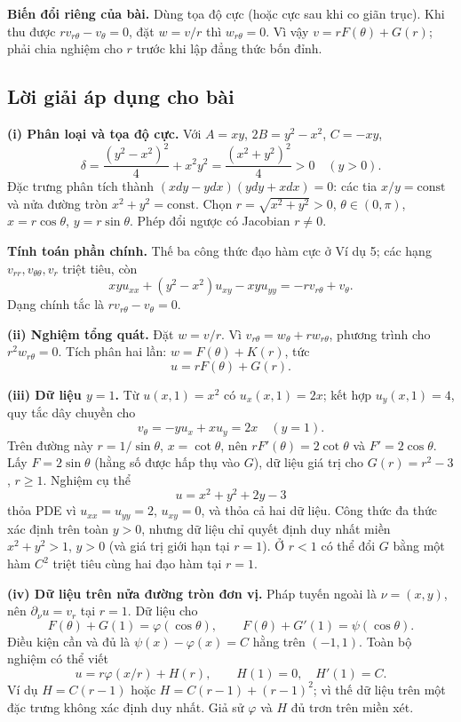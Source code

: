 \documentclass[10pt,a4paper]{article}
\begin{document}
\textbf{Biến đổi riêng của bài.} Dùng tọa độ cực (hoặc cực sau khi co giãn trục). Khi thu được $r v_{r\theta}-v_\theta=0$, đặt $w=v/r$ thì $w_{r\theta}=0$. Vì vậy $v=rF(\theta)+G(r)$; phải chia nghiệm cho $r$ trước khi lập đẳng thức bốn đỉnh.
\subsection*{Lời giải áp dụng cho bài}
\textbf{(i) Phân loại và tọa độ cực.} Với $A=xy$, $2B=y^2-x^2$, $C=-xy$,
\[\delta=\frac{(y^2-x^2)^2}{4}+x^2y^2=\frac{(x^2+y^2)^2}{4}>0\quad(y>0).\]
Đặc trưng phân tích thành $(xdy-ydx)(ydy+xdx)=0$: các tia $x/y=\mathrm{const}$ và nửa đường tròn $x^2+y^2=\mathrm{const}$. Chọn $r=\sqrt{x^2+y^2}>0$, $\theta\in(0,\pi)$, $x=r\cos\theta$, $y=r\sin\theta$. Phép đổi ngược có Jacobian $r\ne0$.

\textbf{Tính toán phần chính.} Thế ba công thức đạo hàm cực ở Ví dụ 5; các hạng $v_{rr},v_{\theta\theta},v_r$ triệt tiêu, còn
\[xyu_{xx}+(y^2-x^2)u_{xy}-xyu_{yy}=-r v_{r\theta}+v_\theta.\]
Dạng chính tắc là $r v_{r\theta}-v_\theta=0$.

\textbf{(ii) Nghiệm tổng quát.} Đặt $w=v/r$. Vì $v_{r\theta}=w_\theta+r w_{r\theta}$, phương trình cho $r^2w_{r\theta}=0$. Tích phân hai lần: $w=F(\theta)+K(r)$, tức
\[\boxed{u=rF(\theta)+G(r).}\]

\textbf{(iii) Dữ liệu $y=1$.} Từ $u(x,1)=x^2$ có $u_x(x,1)=2x$; kết hợp $u_y(x,1)=4$, quy tắc dây chuyền cho
\[v_\theta=-y u_x+xu_y=2x\quad(y=1).\]
Trên đường này $r=1/\sin\theta$, $x=\cot\theta$, nên $rF'(\theta)=2\cot\theta$ và $F'=2\cos\theta$. Lấy $F=2\sin\theta$ (hằng số được hấp thụ vào $G$), dữ liệu giá trị cho $G(r)=r^2-3$, $r\ge1$. Nghiệm cụ thể
\[\boxed{u=x^2+y^2+2y-3}\]
thỏa PDE vì $u_{xx}=u_{yy}=2$, $u_{xy}=0$, và thỏa cả hai dữ liệu. Công thức đa thức xác định trên toàn $y>0$, nhưng dữ liệu chỉ quyết định duy nhất miền $x^2+y^2>1$, $y>0$ (và giá trị giới hạn tại $r=1$). Ở $r<1$ có thể đổi $G$ bằng một hàm $C^2$ triệt tiêu cùng hai đạo hàm tại $r=1$.

\textbf{(iv) Dữ liệu trên nửa đường tròn đơn vị.} Pháp tuyến ngoài là $\nu=(x,y)$, nên $\partial_\nu u=v_r$ tại $r=1$. Dữ liệu cho
\[F(\theta)+G(1)=\varphi(\cos\theta),\qquad F(\theta)+G'(1)=\psi(\cos\theta).\]
Điều kiện cần và đủ là $\psi(x)-\varphi(x)=C$ hằng trên $(-1,1)$. Toàn bộ nghiệm có thể viết
\[u=r\varphi(x/r)+H(r),\qquad H(1)=0,\quad H'(1)=C.\]
Ví dụ $H=C(r-1)$ hoặc $H=C(r-1)+(r-1)^2$; vì thế dữ liệu trên một đặc trưng không xác định duy nhất. Giả sử $\varphi$ và $H$ đủ trơn trên miền xét.
\end{document}
